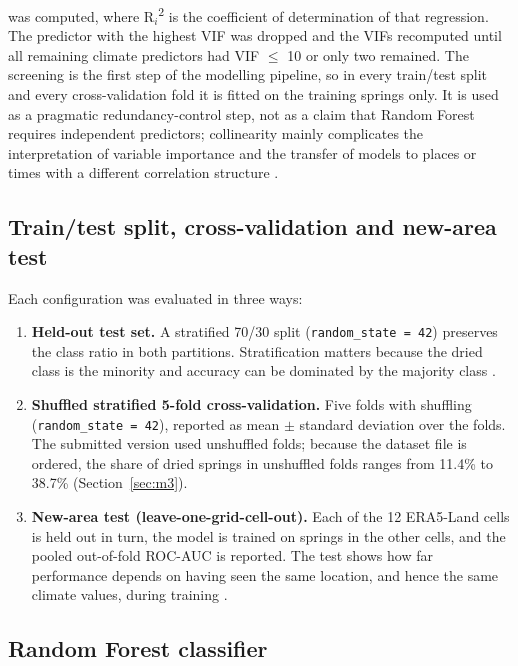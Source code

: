 \documentclass[12pt,a4paper]{article}
\begin{document}
was computed, where R$_i$\textsuperscript{2} is the coefficient of determination of that regression. The predictor with the highest VIF was dropped and the VIFs recomputed until all remaining climate predictors had VIF $\leq$ 10 or only two remained. The screening is the first step of the modelling pipeline, so in every train/test split and every cross-validation fold it is fitted on the training springs only. It is used as a pragmatic redundancy-control step, not as a claim that Random Forest requires independent predictors; collinearity mainly complicates the interpretation of variable importance and the transfer of models to places or times with a different correlation structure \citep{dormann2013}.

\subsection{Train/test split, cross-validation and new-area test}

Each configuration was evaluated in three ways:

\begin{enumerate}
  \item \textbf{Held-out test set.} A stratified 70/30 split (\texttt{random\_\allowbreak{}state = 42}) preserves the class ratio in both partitions. Stratification matters because the dried class is the minority and accuracy can be dominated by the majority class \citep{he2009}.
  \item \textbf{Shuffled stratified 5-fold cross-validation.} Five folds with shuffling (\texttt{random\_\allowbreak{}state = 42}), reported as mean $\pm$ standard deviation over the folds. The submitted version used unshuffled folds; because the dataset file is ordered, the share of dried springs in unshuffled folds ranges from 11.4\% to 38.7\% (Section~\ref{sec:m3}).
  \item \textbf{New-area test (leave-one-grid-cell-out).} Each of the 12 ERA5-Land cells is held out in turn, the model is trained on springs in the other cells, and the pooled out-of-fold ROC-AUC is reported. The test shows how far performance depends on having seen the same location, and hence the same climate values, during training \citep{roberts2017,wenger2012}.
\end{enumerate}

\subsection{Random Forest classifier}
\end{document}
